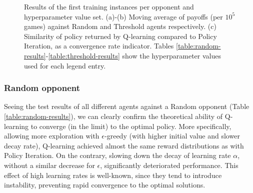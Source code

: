 \begin{figure}[htpb]
\renewcommand*\thesubfigure{\alph{subfigure}}
\centering
\caption{Results of the first training instances per opponent and hyperparameter value set. (a)-(b) Moving average of payoffs (per $10^5$ games) against Random and Threshold agents respectively. (c) Similarity of policy returned by Q-learning compared to Policy Iteration, as a convergence rate indicator. Tables \ref{table:random-results}-\ref{table:threshold-results} show the hyperparameter values used for each legend entry.
}
\label{fig:1}
\end{figure}

\subsubsection{Random opponent}

Seeing the test results of all different agents against a Random opponent (Table \ref{table:random-results}), we can clearly confirm the theoretical ability of Q-learning to converge (in the limit) to the optimal policy. More specifically, allowing more exploration with $\epsilon$-greedy (with higher initial value and slower decay rate), Q-learning achieved almost the same reward distributions as with Policy Iteration. On the contrary, slowing down the decay of learning rate $\alpha$, without a similar decrease for $\epsilon$, significantly deteriorated performance. This effect of high learning rates is well-known, since they tend to introduce instability, preventing rapid convergence to the optimal solutions.

